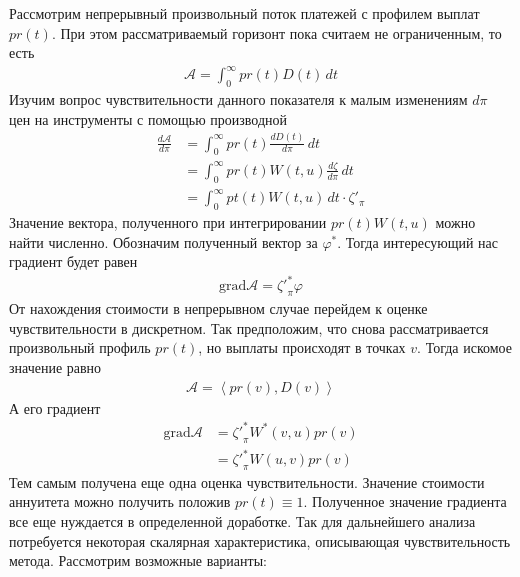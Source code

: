 \documentclass[10pt]{article}
\theoremstyle{definition}
\theoremstyle{remark}
\theoremstyle{plain}
\newcommand{\scalar}[2]{\left<#1,#2\right>}
\begin{document}
Рассмотрим непрерывный произвольный поток платежей с профилем выплат $pr(t)$. При этом рассматриваемый горизонт пока считаем не ограниченным, то есть 
\begin{align*}
\mathcal{A} = \int_0^{\infty} pr(t) D(t)\, dt
\end{align*}
Изучим вопрос чувствительности данного показателя к малым изменениям $d\pi$ цен на инструменты с помощью производной 
\begin{align*}
\frac{d\mathcal{A}}{d\pi} &= \int_0^{\infty} pr(t) \frac{dD(t)}{d\pi}\, dt
\\
&= \int_0^{\infty} pr(t) W(t,u)\frac{d\zeta}{d\pi}\, dt
\\ 
&= \int_0^{\infty} pt(t) W(t,u)\, dt \cdot \zeta'_{\pi}
\end{align*}
Значение вектора, полученного при интегрировании $pr(t)W(t,u)$ можно найти численно. Обозначим полученный вектор за $\varphi^*$. Тогда интересующий нас градиент будет равен
\begin{align*}
\mathrm{grad}\mathcal{A} = {\zeta'}^*_{\pi} \varphi
\end{align*}
От нахождения стоимости в непрерывном случае перейдем к оценке чувствительности в дискретном. Так предположим, что  снова рассматривается произвольный профиль $pr(t)$, но выплаты происходят в точках $v$. Тогда искомое значение равно
\begin{align*}
\mathcal{A} = \scalar{pr(v)}{D(v)}
\end{align*}
А его градиент
\begin{align*}
\mathrm{grad}\mathcal{A} &= {\zeta'}^*_{\pi} W^*(v,u) pr(v) 
\\
&= {\zeta'}^*_{\pi} W(u,v) pr(v)
\end{align*}
Тем самым получена еще одна оценка чувствительности. Значение стоимости аннуитета можно получить положив $pr(t)\equiv 1$.
Полученное значение градиента все еще нуждается в определенной доработке. Так для дальнейшего анализа потребуется некоторая скалярная характеристика, описывающая чувствительность метода. Рассмотрим возможные варианты:
\end{document}
